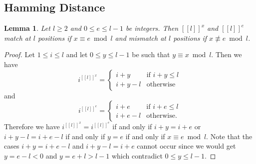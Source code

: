 \documentclass{article}
\newtheorem{lemma}{Lemma}
\newcommand{\llbracket}{[\![}
\newcommand{\rrbracket}{]\!]}
\begin{document}
\subsection{Hamming Distance}
\begin{lemma}\label{lemmahammingdistance}
Let $l \geq 2$ and $0 \leq e \leq l-1$ be integers. Then $\llbracket l \rrbracket^x$ and $\llbracket l \rrbracket^e$ match at $l$ positions if $x \equiv e \bmod l$ and mismatch at $l$ positions if $x \not \equiv e \bmod l$.
\end{lemma}
\begin{proof}
Let $1 \leq i \leq l$ and let $0 \leq y \leq l-1$ be such that $y \equiv x \bmod l$. Then we have
\begin{displaymath}
i^{\llbracket l \rrbracket^x} = \begin{cases}
i+y & \text{if } i+y \leq l\\
i+y-l & \text{otherwise}
\end{cases}
\end{displaymath}
and
\begin{displaymath}
i^{\llbracket l \rrbracket^e} = \begin{cases}
i+e & \text{if } i+e \leq l\\
i+e-l & \text{otherwise}.
\end{cases}
\end{displaymath}
Therefore we have $i^{\llbracket l \rrbracket^x} = i^{\llbracket l \rrbracket^e}$ if and only if $i+y = i+e$ or $i+y-l = i+e-l$ if and only if $y = e$ if and only if $x \equiv e \bmod l$. Note that the cases $i+y = i+e-l$ and $i+y-l = i+e$ cannot occur since we would get $y = e-l < 0$ and $y = e+l > l-1$ which contradict $0 \leq y \leq l-1$.
\end{proof}
\end{document}
